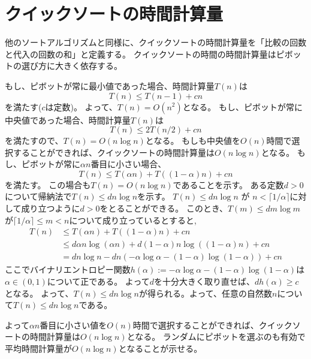 \documentclass[a4paper,twoside,onecolumn,openany,article,10pt]{memoir}
\theoremstyle{remark}
\begin{document}
\section{クイックソートの時間計算量}
他のソートアルゴリズムと同様に、クイックソートの時間計算量を「比較の回数と代入の回数の和」と定義する。
クイックソートの時間の時間計算量はピボットの選び方に大きく依存する。

もし、ピボットが常に最小値であった場合、時間計算量$T(n)$は
\begin{equation*}
T(n) \le T(n-1) + c n
\end{equation*}
を満たす($c$は定数)。
よって、$T(n)=O(n^2)$となる。
%
もし、ピボットが常に中央値であった場合、時間計算量$T(n)$は
\begin{equation*}
T(n) \le 2T(n/2) + c n
\end{equation*}
を満たすので、$T(n) = O(n\log n)$となる。
もしも中央値を$O(n)$時間で選択することができれば、クイックソートの時間計算量は$O(n\log n)$となる。
もし、ピボットが常に$\alpha n$番目に小さい場合、
\begin{equation*}
T(n) \le T(\alpha n) + T((1-\alpha) n) + c n
\end{equation*}
を満たす。
この場合も$T(n)=O(n\log n)$であることを示す。
ある定数$d>0$について帰納法で$T(n)\le dn\log n$を示す。
$T(n)\le dn\log n$ が $n< \lceil 1/\alpha\rceil$に対して成り立つように$d>0$をとることができる。
このとき、$T(m)\le dm\log m$が$\lceil 1/\alpha\rceil\le m<n$について成り立っているとすると,
\begin{align*}
T(n) &\le T(\alpha n) + T((1-\alpha)n) + cn\\
&\le d\alpha n\log(\alpha n) + d(1-\alpha)n\log((1-\alpha)n) + cn\\
&= d n\log n - dn \left(-\alpha \log\alpha - (1-\alpha)\log(1-\alpha)\right) + c n
\end{align*}
ここでバイナリエントロピー関数$h(\alpha):=-\alpha\log\alpha-(1-\alpha)\log(1-\alpha)$は$\alpha\in(0,1)$について正である。
よって$d$を十分大きく取り直せば、$dh(\alpha) \ge c$となる。
よって、$T(n)\le d n\log n$が得られる。よって、任意の自然数$n$について$T(n)\le dn\log n$である。

よって$\alpha n$番目に小さい値を$O(n)$時間で選択することができれば、クイックソートの時間計算量は$O(n\log n)$となる。
ランダムにピボットを選ぶのも有効で平均時間計算量が$O(n\log n)$となることが示せる。


\end{document}
